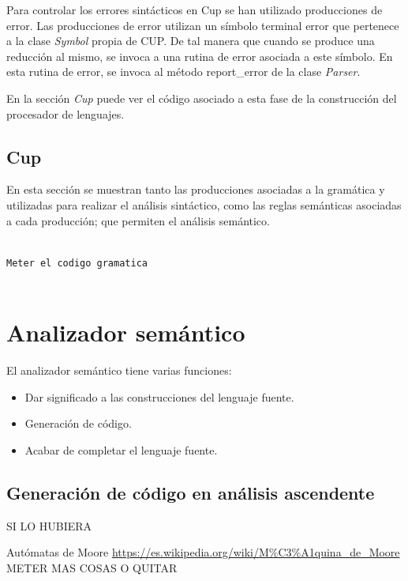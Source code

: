 \documentclass[12pt,a4paper]{article}
\begin{document}
Para controlar los errores sintácticos en Cup se han utilizado producciones de error. Las producciones de error utilizan un símbolo terminal error que pertenece a la clase \textit{Symbol} propia de CUP.\newline
De tal manera que cuando se produce una reducción al mismo, se invoca a una rutina de error asociada a este símbolo. En esta rutina de error, se invoca al método report\_error de la clase \textit{Parser}.

En la sección \textit{Cup} puede ver el código asociado a esta fase de la construcción del procesador de lenguajes.
\clearpage


\subsection{Cup}

En esta sección se muestran tanto las producciones asociadas a la gramática y utilizadas para realizar el análisis sintáctico, como las reglas semánticas asociadas a cada producción; que permiten el análisis semántico. 

\begin{lstlisting}[caption=Analizador Sintáctico y Semántico en CUP]

Meter el codigo gramatica


\end{lstlisting}

\section{Analizador semántico}

El analizador semántico tiene varias funciones:

\begin{itemize}
	\item Dar significado a las construcciones del lenguaje fuente. 
	\item Generación de código.
	\item Acabar de completar el lenguaje fuente.
\end{itemize}

\subsection{Generación de código en análisis ascendente}

SI LO HUBIERA



\clearpage	
	\begin{thebibliography}{99}
		 Autómatas de Moore \url{https://es.wikipedia.org/wiki/M%C3%A1quina_de_Moore}
		 METER MAS COSAS O QUITAR 
	
	\end{thebibliography}	
	
\end{document}
